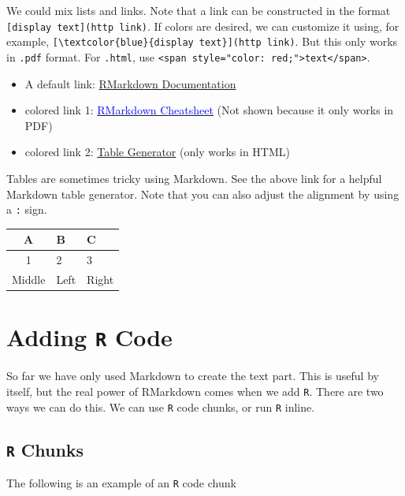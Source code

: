 \documentclass[
]{book}
\providecommand{\tightlist}{%
  \setlength{\itemsep}{0pt}\setlength{\parskip}{0pt}}
\begin{document}
We could mix lists and links. Note that a link can be constructed in the format \texttt{{[}display\ text{]}(http\ link)}. If colors are desired, we can customize it using, for example, \texttt{{[}\textbackslash{}textcolor\{blue\}\{display\ text\}{]}(http\ link)}. But this only works in \texttt{.pdf} format. For \texttt{.html}, use \texttt{\textless{}span\ style="color:\ red;"\textgreater{}text\textless{}/span\textgreater{}}.

\begin{itemize}
\tightlist
\item
  A default link: \href{http://rmarkdown.rstudio.com/}{RMarkdown Documentation}
\item
  colored link 1: \href{https://www.rstudio.com/wp-content/uploads/2015/02/rmarkdown-cheatsheet.pdf}{\textcolor{blue}{RMarkdown Cheatsheet}} (Not shown because it only works in PDF)
\item
  colored link 2: \href{http://www.tablesgenerator.com/markdown_tables}{{Table Generator}} (only works in HTML)
\end{itemize}

Tables are sometimes tricky using Markdown. See the above link for a helpful Markdown table generator. Note that you can also adjust the alignment by using a \texttt{:} sign.

\begin{longtable}[]{@{}cll@{}}
\toprule
A & B & C\tabularnewline
\midrule
\endhead
1 & 2 & 3\tabularnewline
Middle & Left & Right\tabularnewline
\bottomrule
\end{longtable}

\hypertarget{adding-r-code}{%
\section{\texorpdfstring{Adding \texttt{R} Code}{Adding R Code}}\label{adding-r-code}}

So far we have only used Markdown to create the text part. This is useful by itself, but the real power of RMarkdown comes when we add \texttt{R}. There are two ways we can do this. We can use \texttt{R} code chunks, or run \texttt{R} inline.

\hypertarget{r-chunks}{%
\subsection{\texorpdfstring{\texttt{R} Chunks}{R Chunks}}\label{r-chunks}}

The following is an example of an \texttt{R} code chunk
\end{document}
